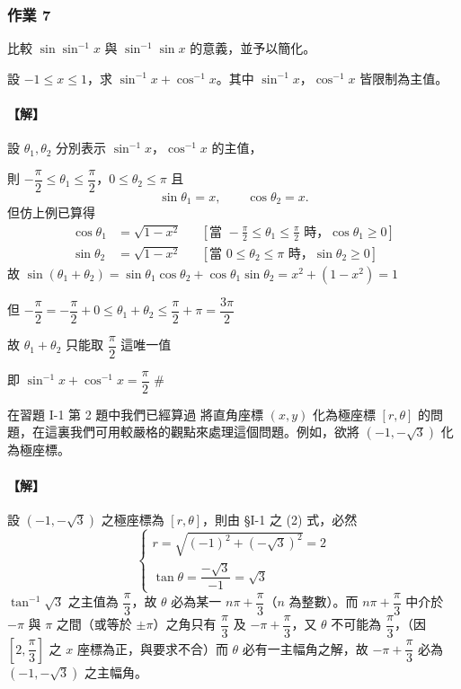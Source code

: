 \medskip
\subsubsection*{作業 7}
比較 $\sin \sin^{-1} x$ 與 $\sin^{-1} \sin x$ 的意義，並予以簡化。

\medskip
\begin{example}\label{ex:b5s-1-2-2}
設 $-1 \le x \le 1$，求 $\sin^{-1} x + \cos^{-1} x$。其中 $\sin^{-1} x$，$\cos^{-1} x$ 皆限制為主值。
\end{example}
\paragraph{【解】}
設 $\theta_1, \theta_2$ 分別表示 $\sin^{-1} x$，$\cos^{-1} x$ 的主值，

則 $-\dfrac{\pi}{2} \le \theta_1 \le \dfrac{\pi}{2}$，$0 \le \theta_2 \le \pi$ 且
\[
\sin \theta_1 = x, \qquad \cos \theta_2 = x.
\]
但仿上例已算得
\begin{align*}
\cos \theta_1 &= \sqrt{1 - x^2} && \left[\text{當 } -\frac{\pi}{2} \le \theta_1 \le \frac{\pi}{2} \text{ 時，}\cos \theta_1 \ge 0\right] \\[0.3em]
\sin \theta_2 &= \sqrt{1 - x^2} && \left[\text{當 } 0 \le \theta_2 \le \pi \text{ 時，}\sin \theta_2 \ge 0\right]
\end{align*}
故 $\sin(\theta_1 + \theta_2) = \sin \theta_1 \cos \theta_2 + \cos \theta_1 \sin \theta_2 = x^2 + (1 - x^2) = 1$

但 $-\dfrac{\pi}{2} = -\dfrac{\pi}{2} + 0 \le \theta_1 + \theta_2 \le \dfrac{\pi}{2} + \pi = \dfrac{3\pi}{2}$

故 $\theta_1 + \theta_2$ 只能取 $\dfrac{\pi}{2}$ 這唯一值

即 $\sin^{-1} x + \cos^{-1} x = \dfrac{\pi}{2}$ \hfill $\#$

\medskip
\begin{example}\label{ex:b5s-1-2-3}
在習題 I-1 第 2 題中我們已經算過 將直角座標 $(x, y)$ 化為極座標 $[r, \theta]$ 的問題，在這裏我們可用較嚴格的觀點來處理這個問題。例如，欲將 $(-1, -\sqrt{3})$ 化為極座標。
\end{example}
\paragraph{【解】}
設 $(-1, -\sqrt{3})$ 之極座標為 $[r, \theta]$，則由 \S I-1 之 (2) 式，必然
\[
\begin{cases}
r = \sqrt{(-1)^2 + (-\sqrt{3})^2} = 2 \\[0.5em]
\tan \theta = \dfrac{-\sqrt{3}}{-1} = \sqrt{3}
\end{cases}
\]
$\tan^{-1} \sqrt{3}$ 之主值為 $\dfrac{\pi}{3}$，故 $\theta$ 必為某一 $n\pi + \dfrac{\pi}{3}$（$n$ 為整數）。而 $n\pi + \dfrac{\pi}{3}$ 中介於 $-\pi$ 與 $\pi$ 之間（或等於 $\pm\pi$）之角只有 $\dfrac{\pi}{3}$ 及 $-\pi + \dfrac{\pi}{3}$，又 $\theta$ 不可能為 $\dfrac{\pi}{3}$，（因 $\left[2, \dfrac{\pi}{3}\right]$ 之 $x$ 座標為正，與要求不合）而 $\theta$ 必有一主幅角之解，故 $-\pi + \dfrac{\pi}{3}$ 必為 $(-1, -\sqrt{3})$ 之主幅角。

